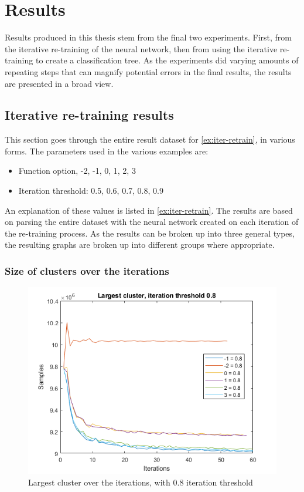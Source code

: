 \chapter{Results}


Results produced in this thesis stem from the final two experiments.
First, from the iterative re-training of the neural network, then from using the iterative re-training to create a classification tree.
As the experiments did varying amounts of repeating steps that can magnify potential errors in the final results, the results are presented in a broad view. 

\section{Iterative re-training results}
This section goes through the entire result dataset for \cref{ex:iter-retrain}, in various forms.
The parameters used in the various examples are:

\begin{itemize}
    \item Function option, -2, -1, 0, 1, 2, 3
    \item Iteration threshold: 0.5, 0.6, 0.7, 0.8, 0.9
\end{itemize}{}
An explanation of these values is listed in \cref{ex:iter-retrain}.
The results are based on parsing the entire dataset with the neural network created on each iteration of the re-training process.
As the results can be broken up into three general types, the resulting graphs are broken up into different groups where appropriate.

\subsection{Size of clusters over the iterations}

\begin{figure}  %
  \centering
  \includegraphics[width=.7\textwidth]{figures/largest-0.8.png}
  \caption{Largest cluster over the iterations, with 0.8 iteration threshold}
  \label{fig:iter:largestcluster0.8}
\end{figure}

